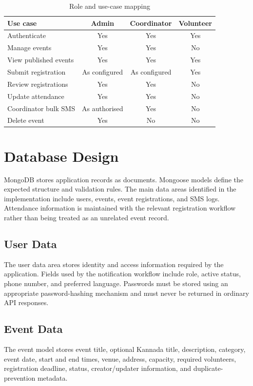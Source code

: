 \documentclass[12pt,a4paper,oneside]{report}
\begin{document}
\begin{table}[H]
\centering
\caption{Role and use-case mapping}
\begin{tabularx}{\textwidth}{|p{4cm}|c|c|c|}
\hline
\textbf{Use case} & \textbf{Admin} & \textbf{Coordinator} & \textbf{Volunteer}\\ \hline
Authenticate & Yes & Yes & Yes\\ \hline
Manage events & Yes & Yes & No\\ \hline
View published events & Yes & Yes & Yes\\ \hline
Submit registration & As configured & As configured & Yes\\ \hline
Review registrations & Yes & Yes & No\\ \hline
Update attendance & Yes & Yes & No\\ \hline
Coordinator bulk SMS & As authorised & Yes & No\\ \hline
Delete event & Yes & No & No\\ \hline
\end{tabularx}
\end{table}

\section{Database Design}
MongoDB stores application records as documents. Mongoose models define the expected structure and validation rules. The main data areas identified in the implementation include users, events, event registrations, and SMS logs. Attendance information is maintained with the relevant registration workflow rather than being treated as an unrelated event record.

\subsection{User Data}
The user data area stores identity and access information required by the application. Fields used by the notification workflow include role, active status, phone number, and preferred language. Passwords must be stored using an appropriate password-hashing mechanism and must never be returned in ordinary API responses.

\subsection{Event Data}
The event model stores event title, optional Kannada title, description, category, event date, start and end times, venue, address, capacity, required volunteers, registration deadline, status, creator/updater information, and duplicate-prevention metadata.
\end{document}

